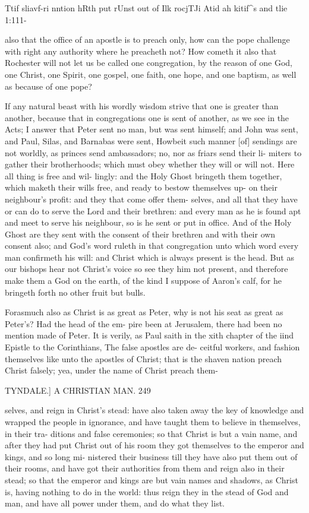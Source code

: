 \documentclass{custom}
\begin{document}
{Ttif sliavf-ri 
nntion hRth 
put rUnst 
out of Ilk 
rocjTJi Atid 
ah kitif^s 
and tlie 1:111- 

also that the office of an apostle is to preach only, how can 
the pope challenge with right any authority where he 
preacheth not? How cometh it also that Rochester will 
not let us be called one congregation, by the reason of one 
God, one Christ, one Spirit, one gospel, one faith, one 
hope, and one baptism, as well as because of one pope? 

If any natural beast with his wordly wisdom strive that 
one is greater than another, because that in congregations 
one is sent of another, as we see in the Acts; I answer 
that Peter sent no man, but was sent himself; and John 
was sent, and Paul, Silas, and Barnabas were sent, 
Howbeit such manner [of] sendings are not worldly, as 
princes send ambassadors; no, nor as friars send their li- 
miters to gather their brotherhoods; which must obey 
whether they will or will not. Here all thing is free and wil- 
lingly: and the Holy Ghost bringeth them together, which 
maketh their wills free, and ready to bestow themselves up- 
on their neighbour's profit: and they that come offer them- 
selves, and all that they have or can do to serve the Lord 
and their brethren: and every man as he is found apt and 
meet to serve his neighbour, so is he sent or put in office. 
And of the Holy Ghost are they sent with the consent of 
their brethren and with their own consent also; and God's 
word ruleth in that congregation unto which word every 
man confirmeth his will: and Christ which is always present 
is the head. But as our bishops hear not Christ's voice 
so see they him not present, and therefore make them a 
God on the earth, of the kind I suppose of Aaron's calf, 
for he bringeth forth no other fruit but bulls. 

Forasmuch also as Christ is as great as Peter, why is 
not his seat as great as Peter's? Had the head of the em- 
pire been at Jerusalem, there had been no mention made of 
Peter. It is verily, as Paul saith in the xith chapter of the 
iind Epistle to the Corinthians, The false apostles are de- 
ceitful workers, and fashion themselves like unto the 
apostles of Christ; that is the shaven nation preach Christ 
falsely; yea, under the name of Christ preach them- 


TYNDALE.] A CHRISTIAN MAN. 249 

selves, and reign in Christ's stead: have also taken away 
the key of knowledge and wrapped the people in ignorance, 
and have taught them to believe in themselves, in their tra- 
ditions and false ceremonies; so that Christ is but a vain
name, and after they had put Christ out of his room they
got themselves to the emperor and kings, and so long mi- 
nistered their business till they have also put them out of 
their rooms, and have got their authorities from them and
reign also in their stead; so that the emperor and kings are 
but vain names and shadows, as Christ is, having nothing to 
do in the world: thus reign they in the stead of God and 
man, and have all power under them, and do what they 
list.

}
\end{document}
